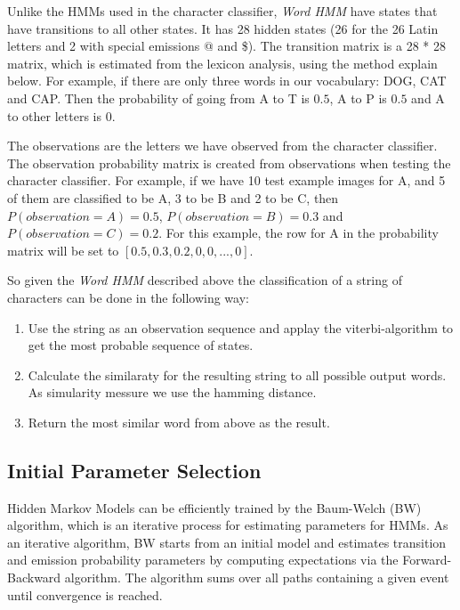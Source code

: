 Unlike the HMMs used in the character classifier, \textit{Word HMM} have states that have transitions to all other states.
It has 28 hidden states (26 for the 26 Latin letters and 2 with special emissions @ and \$). 
The transition matrix is a 28 * 28 matrix, which is estimated from the lexicon analysis, using the method explain below.
For example, if there are only three words in our vocabulary: DOG, CAT and CAP.
Then the probability of going from A to T is $0.5$, A to P is $0.5$ and A to other letters is $0$.

The observations are the letters we have observed from the character classifier.
The observation probability matrix is created from observations when testing the character classifier.
For example, if we have 10 test example images for A, and 5 of them are classified to be A, 3 to be B and 2 to be C, then $P(observation=A)=0.5$, $P(observation=B)=0.3$ and $P(observation=C)=0.2$.
For this example, the row for A in the probability matrix will be set to $[0.5, 0.3, 0.2, 0, 0,...,0]$.

So given the \textit{Word HMM} described above the classification of a string of characters can be done in the following way:

\begin{enumerate}
 \item Use the string as an observation sequence and applay the viterbi-algorithm to get the most probable sequence of states.
 \item Calculate the similaraty for the resulting string to all possible output words. As simularity messure we use the hamming distance. 
 \item Return the most similar word from above as the result.
\end{enumerate}




\subsection{Initial Parameter Selection}

Hidden Markov Models can be efficiently trained by the Baum-Welch (BW) algorithm, which is an iterative process for estimating parameters for HMMs. 
As an iterative algorithm, BW starts from an initial model and estimates transition and emission probability parameters by computing expectations via the Forward-Backward algorithm.
The algorithm sums over all paths containing a given event until convergence is reached.

